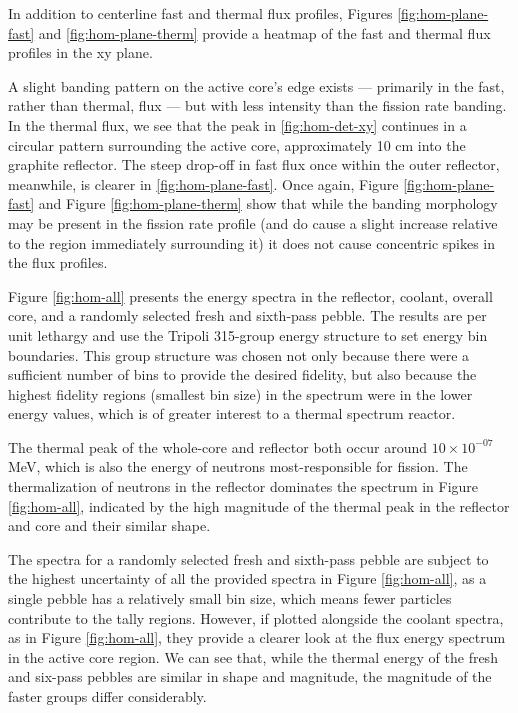 In addition to centerline fast and thermal flux profiles, Figures \ref{fig:hom-plane-fast} and \ref{fig:hom-plane-therm} provide a heatmap of the fast and thermal flux profiles in the xy plane.



A slight banding pattern on the active core's edge exists --- primarily in the fast, rather than thermal, flux --- but with less intensity than the fission rate banding.  In the thermal flux, we see that the peak in \ref{fig:hom-det-xy} continues in a circular pattern surrounding the active core, approximately 10 cm into the graphite reflector.  The steep drop-off in fast flux once within the outer reflector, meanwhile, is clearer in \ref{fig:hom-plane-fast}.  Once again, Figure \ref{fig:hom-plane-fast} and Figure \ref{fig:hom-plane-therm} show that while the banding morphology may be present in the fission rate profile (and do cause a slight increase relative to the region immediately surrounding it) it does not cause concentric spikes in the flux profiles.

Figure \ref{fig:hom-all} presents the energy spectra in the reflector, coolant, overall core, and a randomly selected fresh and sixth-pass pebble.  The results are per unit lethargy and use the Tripoli 315-group energy structure \cite{noauthor_tripoli_nodate} to set energy bin boundaries.  This group structure was chosen not only because there were a sufficient number of bins to provide the desired fidelity, but also because the highest fidelity regions (smallest bin size) in the spectrum were in the lower energy values, which is of greater interest to a thermal spectrum reactor.



The thermal peak of the whole-core and reflector both occur around $10\times10^{-07}$ MeV, which is also the energy of neutrons most-responsible for fission.  The thermalization of neutrons in the reflector dominates the spectrum in Figure \ref{fig:hom-all}, indicated by the high magnitude of the thermal peak in the reflector and core and their similar shape.

The spectra for a randomly selected fresh and sixth-pass pebble are subject to the highest uncertainty of all the provided spectra in Figure \ref{fig:hom-all}, as a single pebble has a relatively small bin size, which means fewer particles contribute to the tally regions.  However, if plotted alongside the coolant spectra, as in Figure \ref{fig:hom-all}, they provide a clearer look at the flux energy spectrum in the active core region.  We can see that, while the thermal energy of the fresh and six-pass pebbles are similar in shape and magnitude, the magnitude of the faster groups differ considerably.

